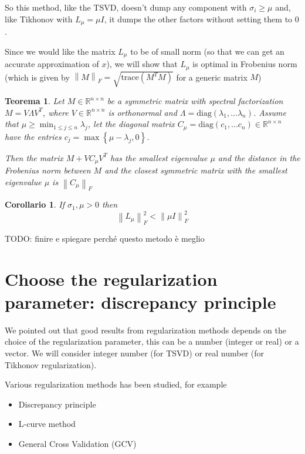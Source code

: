 \documentclass[a4paper,10pt]{article}
\newcounter{counter1}
\theoremstyle{plain}
\newtheorem{myteo}[counter1]{Teorema}
\newtheorem{mycor}[counter1]{Corollario}
\theoremstyle{definition}
\theoremstyle{remark}
\newcommand{\set}[1]{\left\{#1\right\}}
\newcommand{\pa}[1]{\left(#1\right)}
\newcommand{\norm}[1]{\left\|#1\right\|}
\begin{document}
So this method, like the TSVD, doesn't dump any component with $\sigma
_i \ge \mu$ and, like Tikhonov with $L_\mu = \mu I$, it dumps the
other factors without setting them to $0$.

Since we would like the matrix $L_\mu$ to be of small norm (so that we
can get an accurate approximation of $x$), we will show that $L_\mu$
is optimal in Frobenius norm (which is given by $\norm{M}_F = \sqrt{
  \mathrm{trace} \pa{ M^T M } }$ for a generic matrix $M$)

\begin{myteo}
  Let $M \in \mathbb{R}^{n\times n}$ be a symmetric matrix with
  spectral factorization $M = V \Lambda V^T$, where $V \in
  \mathbb{R}^{n \times n}$ is orthonormal and $\Lambda = \mathrm{diag} \pa{
    \lambda _1, ... \lambda _n}$. Assume that $\mu \ge \min _{1\le
    j\le n} \lambda _j$, let the diagonal matrix $C_\mu = \mathrm{diag}
  \pa{ c_1 , ... c_n}\in \mathbb{R}^{n\times n}$ have the entries $c_j
  = \max \set{\mu - \lambda _j, 0}$.
  
  Then the matrix $M + V C_\mu V^T$ has the smallest eigenvalue $\mu$
  and the distance in the Frobenius norm between $M$ and the closest
  symmetric matrix with the smallest eigenvalue $\mu$ is $\norm{ C_\mu
  }_F$
\end{myteo}

\begin{mycor}
  If $\sigma _1,\mu > 0$ then
  \[ \norm{ L_\mu }^2 _F < \norm{ \mu I} ^2_F \]
\end{mycor}

TODO: finire e spiegare perché questo metodo è meglio

\section{Choose the regularization parameter: discrepancy principle}
\label{sec:discrepancy}

We pointed out that good results from regularization methods depends
on the choice of the regularization parameter, this can be a number
(integer or real) or a vector. We will consider integer number (for
TSVD) or real number (for Tikhonov regularization).

Various regularization methods has been studied, for example

\begin{itemize}
\item Discrepancy principle
\item L-curve method
\item General Cross Validation (GCV)
\end{itemize}
\end{document}
